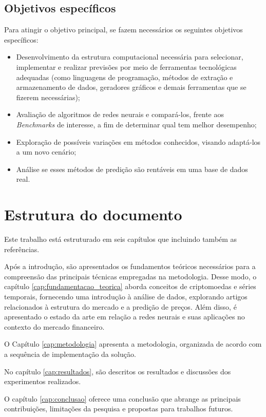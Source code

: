 \subsection{Objetivos específicos}

Para atingir o objetivo principal, se fazem necessários os seguintes objetivos específicos:
\begin{itemize}
    \item Desenvolvimento da estrutura computacional necessária para selecionar, implementar e realizar previsões por meio de ferramentas tecnológicas adequadas (como linguagens de programação, métodos de extração e armazenamento de dados, geradores gráficos e demais ferramentas que se fizerem necessárias);
    \item Avaliação de algoritmos de redes neurais e compará-los, frente aos \textit{Benchmarks} de interesse, a fim de determinar qual tem melhor desempenho;
    \item Exploração de possíveis variações em métodos conhecidos, visando adaptá-los a um novo cenário;
    \item Análise se esses métodos de predição são rentáveis em uma base de dados real.
\end{itemize}

\section{Estrutura do documento}

Este trabalho está estruturado em seis capítulos que incluindo também as referências. 

    Após a introdução, são apresentados os fundamentos teóricos necessários para a compreensão das principais técnicas empregadas na metodologia. 
Desse modo, o capítulo \ref{cap:fundamentacao_teorica} aborda conceitos de criptomoedas e séries temporais, fornecendo uma introdução à análise de dados, explorando artigos relacionados 
à estrutura do mercado e a predição de preços. 
Além disso, é apresentado o estado da arte em relação a redes neurais e suas aplicações no contexto do mercado financeiro.

O Capítulo \ref{cap:metodologia} apresenta a metodologia, organizada de acordo com a sequência de implementação da solução.

    No capítulo \ref{cap:resultados}, são descritos os resultados e discussões dos experimentos realizados.

    O capítulo \ref{cap:conclusao} oferece uma conclusão que abrange as principais contribuições, limitações da pesquisa e propostas para trabalhos futuros.